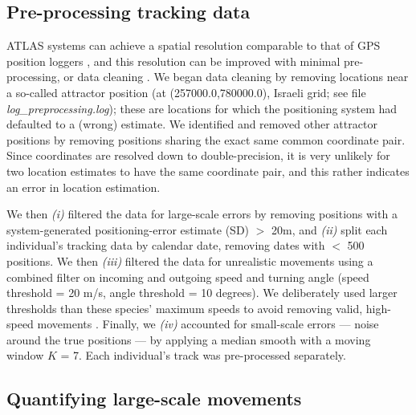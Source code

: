 \begin{refsection}
\subsection*{Pre-processing tracking data}

ATLAS systems can achieve a spatial resolution comparable to that of GPS position loggers \citep{weiser2016,beardsworth2021}, and this resolution can be improved with minimal pre-processing, or data cleaning \citep{beardsworth2021, gupte2022d}.
We began data cleaning by removing locations near a so-called attractor position (at (257000.0,780000.0), Israeli grid; see file \textit{log\_preprocessing.log}); these are locations for which the positioning system had defaulted to a (wrong) estimate.
We identified and removed other attractor positions by removing positions sharing the exact same common coordinate pair. 
Since coordinates are resolved down to double-precision, it is very unlikely for two location estimates to have the same coordinate pair, and this rather indicates an error in location estimation.

We then \textit{(i)} filtered the data for large-scale errors by removing positions with a system-generated positioning-error estimate (SD) $>$ 20m, and \textit{(ii)} split each individual's tracking data by calendar date, removing dates with $<$ 500 positions. We then \textit{(iii)} filtered the data for unrealistic movements using a combined filter on incoming and outgoing speed and turning angle (speed threshold = 20 m/s, angle threshold = 10 degrees).
We deliberately used larger thresholds than these species' maximum speeds to avoid removing valid, high-speed movements \citep{gupte2022d}.
Finally, we \textit{(iv)} accounted for small-scale errors --- noise around the true positions --- by applying a median smooth with a moving window $K$ = 7.
Each individual's track was pre-processed separately.

\subsection*{Quantifying large-scale movements}


\end{refsection}
